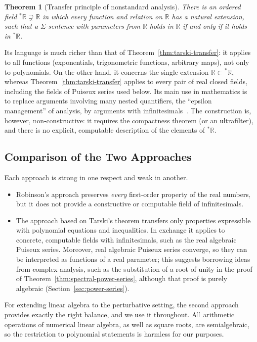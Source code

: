 \documentclass[12pt, a4paper]{report}
\theoremstyle{plain}
\newtheorem{theorem}{Theorem}[chapter]
\theoremstyle{definition}
\theoremstyle{remark}
\theoremstyle{plain}
\newcommand{\RR}{\mathbb{R}}
\begin{document}
\begin{theorem}[Transfer principle of nonstandard analysis]\label{thm:robinson-transfer}
There is an ordered field ${}^*\RR\supsetneq\RR$ in which every function and relation on $\RR$ has a natural extension, such that a $\Sigma$-sentence with parameters from $\RR$ holds in $\RR$ if and only if it holds in ${}^*\RR$.
\end{theorem}
Its language is much richer than that of Theorem~\ref{thm:tarski-transfer}: it applies to all functions (exponentials, trigonometric functions, arbitrary maps), not only to polynomials. On the other hand, it concerns the single extension $\RR\subset{}^*\RR$, whereas Theorem~\ref{thm:tarski-transfer} applies to every pair of real closed fields, including the fields of Puiseux series used below. Its main use in mathematics is to replace arguments involving many nested quantifiers, the ``epsilon management'' of analysis, by arguments with infinitesimals~\cite{Tao2007}. The construction is, however, non-constructive: it requires the compactness theorem (or an ultrafilter), and there is no explicit, computable description of the elements of ${}^*\RR$.

\subsection{Comparison of the Two Approaches}
\label{subsec:comparison}
Each approach is strong in one respect and weak in another.
\begin{itemize}
    \item Robinson's approach preserves \emph{every} first-order property of the real numbers, but it does not provide a constructive or computable field of infinitesimals.
    \item The approach based on Tarski's theorem transfers only properties expressible with polynomial equations and inequalities. In exchange it applies to concrete, computable fields with infinitesimals, such as the real algebraic Puiseux series. Moreover, real algebraic Puiseux series converge, so they can be interpreted as functions of a real parameter; this suggests borrowing ideas from complex analysis, such as the substitution of a root of unity in the proof of Theorem~\ref{thm:spectral-power-series}, although that proof is purely algebraic (Section~\ref{sec:power-series}).
\end{itemize}
For extending linear algebra to the perturbative setting, the second approach provides exactly the right balance, and we use it throughout. All arithmetic operations of numerical linear algebra, as well as square roots, are semialgebraic, so the restriction to polynomial statements is harmless for our purposes.
\end{document}
